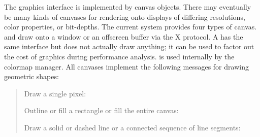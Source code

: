 \documentclass[letterpaper,10pt,english]{sphinxmanual}
\begin{document}
The graphics interface is implemented by canvas objects. There may eventually be many kinds of canvases for rendering onto displays of differing resolutions, color properties, or bit-depths. The current system provides four types of canvas.  and  draw onto a window or an offscreen buffer via the X protocol. A  has the same interface but does not actually draw anything; it can be used to factor out the cost of graphics during performance analysis.  is used internally by the colormap manager. All canvases implement the following messages for drawing geometric shapes:
\begin{quote}

Draw a single pixel:

\begin{sphinxVerbatim}[commandchars=\\\{\}]
   
\end{sphinxVerbatim}

Outline or fill a rectangle or fill the entire canvas:

\begin{sphinxVerbatim}[commandchars=\\\{\}]
   
     
   
 
\end{sphinxVerbatim}

Draw a solid or dashed line or a connected sequence of line segments:

\begin{sphinxVerbatim}[commandchars=\\\{\}]
     
       
         
           
   
     
\end{sphinxVerbatim}


\end{quote}
\end{document}

